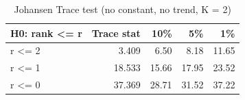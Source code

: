 \begin{table}

\caption{\label{tab:johansen}Johansen Trace test (no constant, no trend, K = 2)}
\centering
\begin{tabular}[t]{lrrrr}
\toprule
H0: rank <= r & Trace stat & 10\% & 5\% & 1\%\\
\midrule
r <= 2 & 3.409 & 6.50 & 8.18 & 11.65\\
r <= 1 & 18.533 & 15.66 & 17.95 & 23.52\\
r <= 0 & 37.369 & 28.71 & 31.52 & 37.22\\
\bottomrule
\end{tabular}
\end{table}

